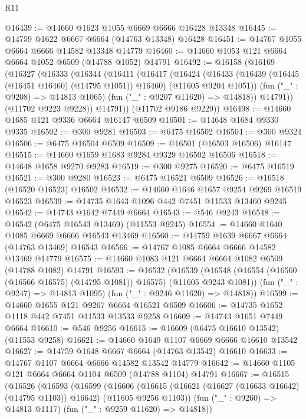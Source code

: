 \begin{lexlean}{R11}
\begin{coremodule}
@16439 := @14660 @1623 @1055 @6669 @6666 @16428 @13348
@16445 := @14759 @1622 @6667 @6664 (@14763 @13348) @16428
@16451 := @14767 @1055 @6664 @6666 @14582 @13348 @14779
@16460 := @14660 @1053 @121 @6664 @6664 @1052 @6509 (@14788 @1052) @14791
@16492 := @16158
    (@16169
      (@16327
        (@16333
          (@16344
            (@16411
              (@16417
                (@16424
                  (@16433
                    (@16439 (@16445 (@16451 @16460) (@14795 @1051)) @16460)
                    (@11605 @9204 @1051))
                  (fun ("_" : @9208) => @14813 @1065)
                  (fun ("_" : @9207 @11620) => @14818))
                @14791))
            (@11702 @9223 @9228))
          @14791))
      (@11702 @9186 @9229))
@16498 := @14660 @1685 @121 @9336 @6664 @16147 @6509
@16501 := @14648 @1684 @9330 @9335
@16502 := @300 @9281
@16503 := @6475 @16502
@16504 := @300 @9324
@16506 := @6475 @16504 @6509
@16509 := @16501 (@16503 @16506) @16147
@16515 := @14660 @1659 @1683 @9284 @9329 @16502 @16506
@16518 := @14648 @1658 @9270 @9283
@16519 := @300 @9275
@16520 := @6475 @16519
@16521 := @300 @9280
@16523 := @6475 @16521 @6509
@16526 := @16518 (@16520 @16523) @16502
@16532 := @14660 @1646 @1657 @9254 @9269 @16519 @16523
@16539 := @14735 @1643 @1096 @442 @7451 @11533 @13460 @9245
@16542 := @14743 @1642 @7449 @6664
@16543 := @546 @9243
@16548 := @16542 (@6475 @16543 @13469) (@11553 @9245)
@16554 := @14660 @1640 @1085 @6669 @6666 @16543 @13469
@16560 := @14759 @1639 @6667 @6664 (@14763 @13469) @16543
@16566 := @14767 @1085 @6664 @6666 @14582 @13469 @14779
@16575 := @14660 @1083 @121 @6664 @6664 @1082 @6509 (@14788 @1082) @14791
@16593 := @16532
    (@16539
      (@16548 (@16554 (@16560 (@16566 @16575) (@14795 @1081)) @16575) (@11605 @9243 @1081))
      (fun ("_" : @9247) => @14813 @1095)
      (fun ("_" : @9246 @11620) => @14818))
@16599 := @14660 @1655 @121 @9267 @6664 @16521 @6509
@16606 := @14735 @1652 @1118 @442 @7451 @11533 @13533 @9258
@16609 := @14743 @1651 @7449 @6664
@16610 := @546 @9256
@16615 := @16609 (@6475 @16610 @13542) (@11553 @9258)
@16621 := @14660 @1649 @1107 @6669 @6666 @16610 @13542
@16627 := @14759 @1648 @6667 @6664 (@14763 @13542) @16610
@16633 := @14767 @1107 @6664 @6666 @14582 @13542 @14779
@16642 := @14660 @1105 @121 @6664 @6664 @1104 @6509 (@14788 @1104) @14791
@16667 := @16515
    (@16526
      (@16593
        (@16599
          (@16606
            (@16615 (@16621 (@16627 (@16633 @16642) (@14795 @1103)) @16642) (@11605 @9256 @1103))
            (fun ("_" : @9260) => @14813 @1117)
            (fun ("_" : @9259 @11620) => @14818))

\end{coremodule}
\end{lexlean}
